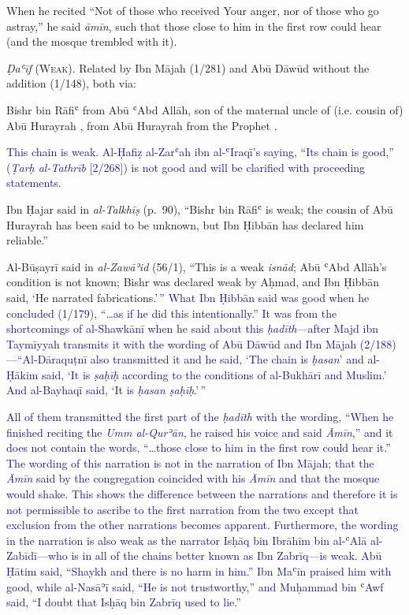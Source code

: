 \begin{mdframed}[style=narration, frametitle={Narration \#952}]
When he recited “Not of those who received Your anger, nor of those who go astray,” he said \textit{āmīn}, such that those close to him in the first row could hear (and the mosque trembled with it).
\end{mdframed}

\emph{Ḍaʿīf} (\textsc{Weak}). Related by Ibn Mājah (1/281) and Abū Dāwūd
without the addition (1/148), both via:

Bishr bin Rāfiʿ from Abū ʿAbd Allāh, son of the maternal uncle of (i.e. cousin of) Abū Hurayrah \mabpwhim,
from Abū Hurayrah \mabpwhim from the Prophet \pbuh.

\textcolor{MidnightBlue}{This chain is weak. Al-Ḥafiẓ
al-Zarʿah ibn al-ʿIraqī's saying, “Its chain is good,” (\textit{Ṭarḥ al-Tathrīb} [2/268]) is not good and will be clarified with proceeding statements.}

Ibn Ḥajar said in \emph{al-Talkhīṣ} (p.~90), ``Bishr bin Rāfiʿ is weak;
the cousin of Abū Hurayrah \mabpwhim has been said to be unknown, but
Ibn Ḥibbān has declared him reliable.''

Al-Būṣayrī said in \emph{al-Zawāʾid} (56/1), ``This is a weak
\emph{isnād}; Abū ʿAbd Allāh's condition is not known; Bishr was
declared weak by Aḥmad, and Ibn Ḥibbān said, `He narrated
fabrications.'\,'' \textcolor{MidnightBlue}{What Ibn Ḥibbān said was good when he concluded (1/179), ``\ldots{}as if
  he did this intentionally.'' It was from the shortcomings of al-Shawkānī
  when he said about this \emph{ḥadīth}---after Majd ibn Taymīyyah
  transmits it with the wording of Abū Dāwūd and Ibn Mājah
  (2/188)---``Al-Dāraquṭnī also transmitted it and he said, `The chain is
  \emph{ḥasan}' and al-Ḥākim said, `It is \emph{ṣaḥīḥ} according to the
  conditions of al-Bukhārī and Muslim.' And al-Bayhaqī said, `It is
  \emph{ḥasan ṣaḥīḥ}.'\,''}
  
\textcolor{MidnightBlue}{All of them transmitted the first part of the
\emph{ḥadīth} with the wording, ``When he finished reciting the \emph{Umm al-Qurʾān},
he raised his voice and said \emph{Āmīn},'' and it does not contain the words,
``\ldots{}those close to him in the first row could hear it.'' The
wording of this narration is not in the narration of Ibn Mājah; that the
\emph{Āmīn} said by the congregation coincided with his
\pbuh \emph{Āmīn} and that the mosque would shake. This shows the
difference between the narrations and therefore it is not permissible to
ascribe to the first narration from the two except that exclusion from the
other narrations becomes apparent. Furthermore, the wording in the narration
is also weak as the narrator Isḥāq bin Ibrāhīm bin al-ʿAlā
al-Zabīdī---who is in all of the chains better known as Ibn Zabrīq---is
weak. Abū Ḥātim said, ``Shaykh and there is no harm in him.'' Ibn Maʿīn
praised him with good, while al-Nasāʾī said, ``He is not trustworthy,''
and Muḥammad bin ʿAwf said, ``I doubt that Isḥāq bin Zabrīq used to
lie.''}

